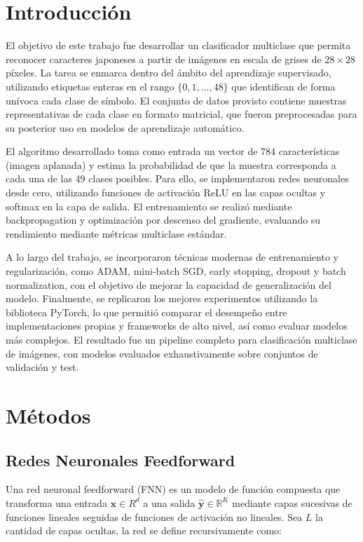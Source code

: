 \documentclass[11pt]{article}
\begin{document}
\section{Introducción}
El objetivo de este trabajo fue desarrollar un clasificador multiclase que permita reconocer caracteres japoneses a partir de imágenes en escala de grises de \(28 \times 28\) píxeles. La tarea se enmarca dentro del ámbito del aprendizaje supervisado, utilizando etiquetas enteras en el rango \( \{0, 1, \ldots, 48\} \) que identifican de forma unívoca cada clase de símbolo. El conjunto de datos provisto contiene muestras representativas de cada clase en formato matricial, que fueron preprocesadas para su posterior uso en modelos de aprendizaje automático.

El algoritmo desarrollado toma como entrada un vector de \(784\) características (imagen aplanada) y estima la probabilidad de que la muestra corresponda a cada una de las 49 clases posibles. Para ello, se implementaron redes neuronales desde cero, utilizando funciones de activación ReLU en las capas ocultas y softmax en la capa de salida. El entrenamiento se realizó mediante backpropagation y optimización por descenso del gradiente, evaluando su rendimiento mediante métricas multiclase estándar.

A lo largo del trabajo, se incorporaron técnicas modernas de entrenamiento y regularización, como ADAM, mini-batch SGD, early stopping, dropout y batch normalization, con el objetivo de mejorar la capacidad de generalización del modelo. Finalmente, se replicaron los mejores experimentos utilizando la biblioteca PyTorch, lo que permitió comparar el desempeño entre implementaciones propias y frameworks de alto nivel, así como evaluar modelos más complejos. El resultado fue un pipeline completo para clasificación multiclase de imágenes, con modelos evaluados exhaustivamente sobre conjuntos de validación y test.


\section{Métodos}

\subsection*{Redes Neuronales Feedforward}

Una red neuronal feedforward (FNN) es un modelo de función compuesta que transforma una entrada $ \mathbf{x} \in {R}^d $ a una salida \( \hat{\mathbf{y}} \in \mathbb{R}^K \) mediante capas sucesivas de funciones lineales seguidas de funciones de activación no lineales. Sea \( L \) la cantidad de capas ocultas, la red se define recursivamente como:
\end{document}
